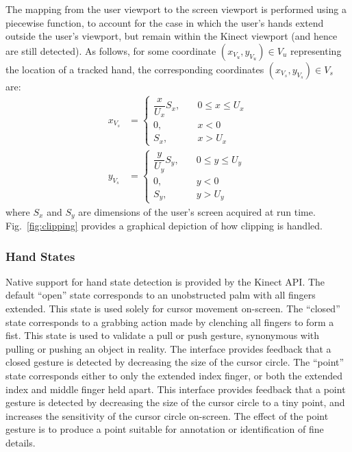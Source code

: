 \documentclass{scrartcl}
\numberwithin{equation}{section}
\begin{document}
      The mapping from the user viewport to the screen viewport is performed using a piecewise function, to account for the case in which the user's hands extend outside the user's viewport, but remain within the Kinect viewport (and hence are still detected). As follows, for some coordinate $(x_{V_u},y_{V_u}) \in V_u$ representing the location of a tracked hand, the corresponding coordinates $(x_{V_s},y_{V_s}) \in V_s$ are:
      \begin{align*}
        x_{V_s} &=
        \begin{cases}
          \dfrac{x}{U_x}S_x, &\quad 0 \leq x \leq U_x \\
          0, &\quad x < 0 \\
          S_x, &\quad x > U_x
        \end{cases} \\
        y_{V_s} &=
        \begin{cases}
          \dfrac{y}{U_y}S_y, &\quad 0 \leq y \leq U_y \\
          0, &\quad y < 0 \\
          S_y, &\quad y > U_y
        \end{cases}
      \end{align*}
      where $S_x$ and $S_y$ are dimensions of the user's screen acquired at run time. Fig.~\ref{fig:clipping} provides a graphical depiction of how clipping is handled.
      \subsubsection{Hand States}
      Native support for hand state detection is provided by the Kinect API. The default ``open'' state corresponds to an unobstructed palm with all fingers extended. This state is used solely for cursor movement on-screen. The ``closed'' state corresponds to a grabbing action made by clenching all fingers to form a fist. This state is used to validate a pull or push gesture, synonymous with pulling or pushing an object in reality. The interface provides feedback that a closed gesture is detected by decreasing the size of the cursor circle. The ``point'' state corresponds either to only the extended index finger, or both the extended index and middle finger held apart. This interface provides feedback that a point gesture is detected by decreasing the size of the cursor circle to a tiny point, and increases the sensitivity of the cursor circle on-screen. The effect of the point gesture is to produce a point suitable for annotation or identification of fine details.
\end{document}
